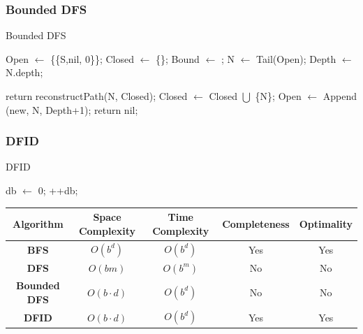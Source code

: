 \vspace{0.35cm}

\subsubsection{Bounded DFS}

\begin{algorithm}[ht]
\caption{Bounded DFS}
\begin{algorithmic}
\State Open \(\gets\) \{\{S,nil, 0\}\};  
\State Closed \(\gets\) \{\};
\State Bound \(\gets\) ;
\vspace{0.1cm}
    \State N \(\gets\) Tail(Open);
    \State Depth \(\gets\) N.depth;  

        \State return reconstructPath(N, Closed);
       
    \State Closed \(\gets\) Closed \(\bigcup\) \{N\};
                \State Open \(\gets\) Append ({new, N, Depth+1});
            \EndIf
        \EndFor
    \EndIf
\vspace{0.07cm}
\EndWhile
\vspace{0.1cm}
\State return nil;
\end{algorithmic}
\end{algorithm}

\newpage

\subsubsection{DFID}

\begin{algorithm}[ht]
\caption{DFID}
\begin{algorithmic}
\State db \(\gets\) 0;
\State++db;
\EndWhile
\end{algorithmic}
\end{algorithm}

\vspace{0.35cm}

\begin{table}[ht]
\centering
\begin{tabular}{|c|c|c|c|c|}
\hline
\textbf{Algorithm} & \textbf{Space Complexity} & \textbf{Time Complexity} & \textbf{Completeness} & \textbf{Optimality} \\
\hline
\textbf{BFS} & \( O(b^d) \) & \( O(b^d) \) & Yes & Yes \\
\hline
\textbf{DFS} & \( O(bm) \) & \( O(b^m) \) & No & No \\
\hline
\textbf{Bounded DFS} & \( O(b \cdot d) \) & \( O(b^d) \) & No & No \\
\hline
\textbf{DFID} & \( O(b \cdot d) \) & \( O(b^d) \) & Yes & Yes \\
\hline
\end{tabular}
\end{table}

